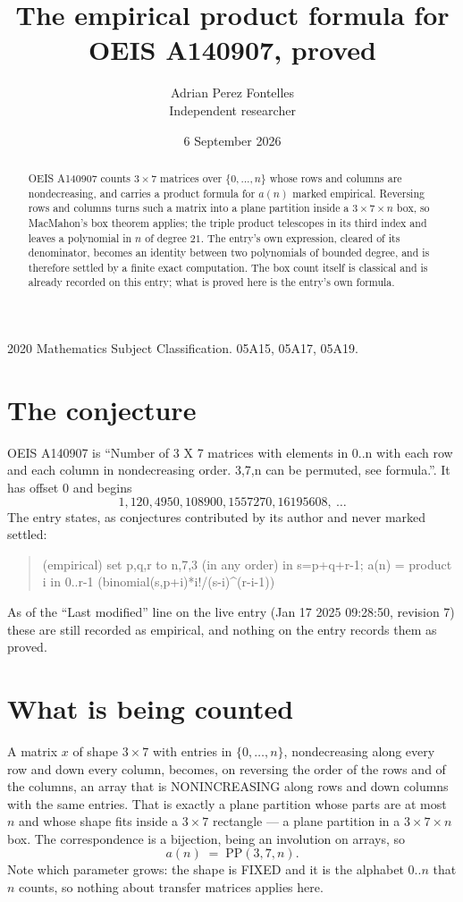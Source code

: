 \documentclass[11pt,a4paper]{article}
\title{The empirical product formula for OEIS A140907, proved}
\author{Adrian Perez Fontelles\\ \small Independent researcher}
\date{6 September 2026}
\theoremstyle{plain}
\theoremstyle{definition}
\begin{document}
\maketitle

\begin{abstract}
OEIS A140907 counts $3\times7$ matrices over $\{0,\dots,n\}$ whose rows and columns are
nondecreasing, and carries a product formula for $a(n)$ marked empirical. Reversing rows and
columns turns such a matrix into a plane partition inside a $3\times7\times n$ box, so
MacMahon's box theorem applies; the triple product telescopes in its third index and leaves a
polynomial in $n$ of degree $21$. The entry's own expression, cleared of its denominator,
becomes an identity between two polynomials of bounded degree, and is therefore settled by a
finite exact computation. The box count itself is classical and is already recorded on this
entry; what is proved here is the entry's own formula.
\end{abstract}

\noindent\small 2020 Mathematics Subject Classification. 05A15, 05A17, 05A19.\normalsize

\section{The conjecture}

OEIS A140907 is ``Number of 3 X 7 matrices with elements in 0..n with each row and each column in nondecreasing order. 3,7,n can be permuted, see formula.''. It has offset $0$ and begins
\[
1, 120, 4950, 108900, 1557270, 16195608,\ \dots
\]
The entry states, as conjectures contributed by its author and never marked settled:
\begin{quote}
(empirical) set p,q,r to n,7,3 (in any order) in s=p+q+r-1; a(n) = product {i in 0..r-1} (binomial(s,p+i)*i!/(s-i)\^{}(r-i-1))

\end{quote}
As of the ``Last modified'' line on the live entry (Jan 17 2025 09:28:50, revision 7) these are still
recorded as empirical, and nothing on the entry records them as proved.

\section{What is being counted}

A matrix $x$ of shape $3\times7$ with entries in $\{0,\dots,n\}$, nondecreasing along
every row and down every column, becomes, on reversing the order of the rows and of the
columns, an array that is NONINCREASING along rows and down columns with the same entries. That
is exactly a plane partition whose parts are at most $n$ and whose shape fits inside a
$3\times7$ rectangle --- a plane partition in a $3\times7\times n$ box. The
correspondence is a bijection, being an involution on arrays, so
\[
a(n)\;=\;\mathrm{PP}(3,7,n).
\]
Note which parameter grows: the shape is FIXED and it is the alphabet $0..n$ that $n$ counts,
so nothing about transfer matrices applies here.
\end{document}
